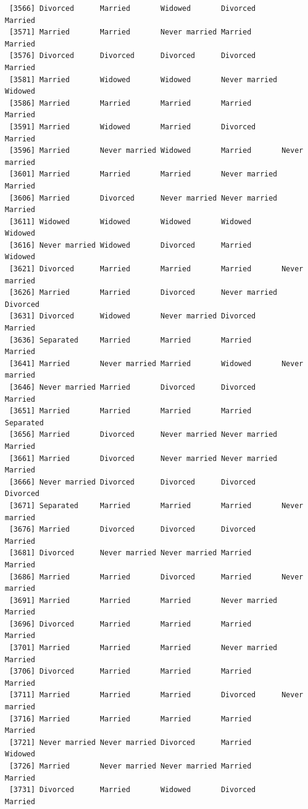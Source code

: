 \documentclass[
  letterpaper,
  DIV=11,
  numbers=noendperiod,
  oneside]{scrartcl}
\begin{document}
\begin{verbatim}
 [3566] Divorced      Married       Widowed       Divorced      Married      
 [3571] Married       Married       Never married Married       Married      
 [3576] Divorced      Divorced      Divorced      Divorced      Married      
 [3581] Married       Widowed       Widowed       Never married Widowed      
 [3586] Married       Married       Married       Married       Married      
 [3591] Married       Widowed       Married       Divorced      Married      
 [3596] Married       Never married Widowed       Married       Never married
 [3601] Married       Married       Married       Never married Married      
 [3606] Married       Divorced      Never married Never married Married      
 [3611] Widowed       Widowed       Widowed       Widowed       Widowed      
 [3616] Never married Widowed       Divorced      Married       Widowed      
 [3621] Divorced      Married       Married       Married       Never married
 [3626] Married       Married       Divorced      Never married Divorced     
 [3631] Divorced      Widowed       Never married Divorced      Married      
 [3636] Separated     Married       Married       Married       Married      
 [3641] Married       Never married Married       Widowed       Never married
 [3646] Never married Married       Divorced      Divorced      Married      
 [3651] Married       Married       Married       Married       Separated    
 [3656] Married       Divorced      Never married Never married Married      
 [3661] Married       Divorced      Never married Never married Married      
 [3666] Never married Divorced      Divorced      Divorced      Divorced     
 [3671] Separated     Married       Married       Married       Never married
 [3676] Married       Divorced      Divorced      Divorced      Married      
 [3681] Divorced      Never married Never married Married       Married      
 [3686] Married       Married       Divorced      Married       Never married
 [3691] Married       Married       Married       Never married Married      
 [3696] Divorced      Married       Married       Married       Married      
 [3701] Married       Married       Married       Never married Married      
 [3706] Divorced      Married       Married       Married       Married      
 [3711] Married       Married       Married       Divorced      Never married
 [3716] Married       Married       Married       Married       Married      
 [3721] Never married Never married Divorced      Married       Widowed      
 [3726] Married       Never married Never married Married       Married      
 [3731] Divorced      Married       Widowed       Divorced      Married      

\end{verbatim}
\end{document}
